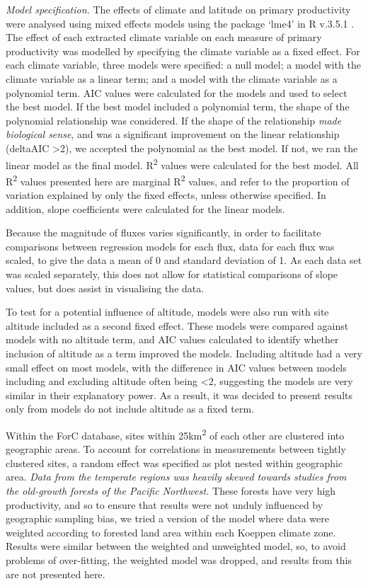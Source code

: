 \documentclass[]{article}
\begin{document}
\emph{Model specification.} The effects of climate and latitude on
primary productivity were analysed using mixed effects models using the
package `lme4' \citep{bates_fitting_2015} in R v.3.5.1
\citep{r_core_team_r:_2018}. The effect of each extracted climate
variable on each measure of primary productivity was modelled by
specifying the climate variable as a fixed effect. For each climate
variable, three models were specified: a null model; a model with the
climate variable as a linear term; and a model with the climate variable
as a polynomial term. AIC values were calculated for the models and used
to select the best model. If the best model included a polynomial term,
the shape of the polynomial relationship was considered. If the shape of
the relationship \emph{made biological sense}, and was a significant
improvement on the linear relationship (deltaAIC \textgreater{}2), we
accepted the polynomial as the best model. If not, we ran the linear
model as the final model. R\textsuperscript{2} values were calculated
for the best model. All R\textsuperscript{2} values presented here are
marginal R\textsuperscript{2} values, and refer to the proportion of
variation explained by only the fixed effects, unless otherwise
specified. In addition, slope coefficients were calculated for the
linear models.

Because the magnitude of fluxes varies significantly, in order to
facilitate comparisons between regression models for each flux, data for
each flux was scaled, to give the data a mean of 0 and standard
deviation of 1. As each data set was scaled separately, this does not
allow for statistical comparisons of slope values, but does assist in
visualising the data.

To test for a potential influence of altitude, models were also run with
site altitude included as a second fixed effect. These models were
compared against models with no altitude term, and AIC values calculated
to identify whether inclusion of altitude as a term improved the models.
Including altitude had a very small effect on most models, with the
difference in AIC values between models including and excluding altitude
often being \textless{}2, suggesting the models are very similar in
their explanatory power. As a result, it was decided to present results
only from models do not include altitude as a fixed term.

Within the ForC database, sites within 25km\textsuperscript{2} of each
other are clustered into geographic areas. To account for correlations
in measurements between tightly clustered sites, a random effect was
specified as plot nested within geographic area. \emph{Data from the
temperate regions was heavily skewed towards studies from the old-growth
forests of the Pacific Northwest.} These forests have very high
productivity, and so to ensure that results were not unduly influenced
by geographic sampling bias, we tried a version of the model where data
were weighted according to forested land area within each Koeppen
climate zone. Results were similar between the weighted and unweighted
model, so, to avoid problems of over-fitting, the weighted model was
dropped, and results from this are not presented here.
\end{document}
